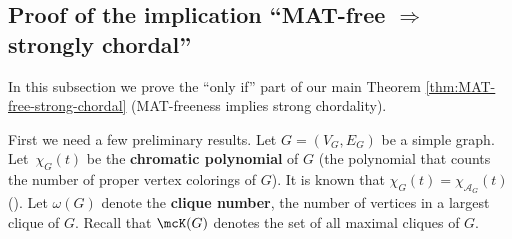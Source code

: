 \subsection{Proof of the implication ``MAT-free \texorpdfstring{$\Rightarrow$}{implies} strongly chordal''}
\label{subsec:MAT-free implies strongly chordal}
 
In this subsection we prove the ``only if'' part of our main Theorem \ref{thm:MAT-free-strong-chordal} (MAT-freeness implies strong chordality).

First we need a few preliminary results.
Let $ G = (V_{G}, E_{G}) $ be a simple graph. 
Let~$ \chi_G(t)$ be the \textbf{chromatic polynomial} of $G$ (the polynomial that counts the number of proper vertex colorings of $G$). 
It is known that $ \chi_G(t) = \chi_{ \mathcal{A}_{G} }(t) $ (\eg  \cite[Theorem 2.88]{OT92}).
Let $ \omega(G) $ denote the \textbf{clique number}, the number of vertices in a largest clique of $ G $. 
Recall that $\mcK(G)$ denotes the set of all maximal cliques of $G$.

